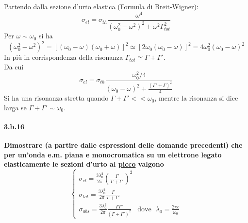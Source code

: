 \documentclass[twoside]{article}
\begin{document}
Partendo dalla sezione d'urto elastica (Formula di Breit-Wigner):
\begin{equation}
    \sigma_{el}=\sigma_{th}\frac{\omega^4}{(\omega_0^2-\omega^2)^2+\omega^2 \Gamma_{tot}^2}
\end{equation}
Per $\omega \sim \omega_0$ si ha
\begin{equation}
    (\omega_0^2-\omega^2)^2= [(\omega_0-\omega)(\omega_0+\omega)]^2\simeq[2\omega_0(\omega_0-\omega)]^2=4\omega_0^2(\omega_0-\omega)^2
\end{equation}
In più in corrispondenza della risonanza $\Gamma_{tot}\simeq \Gamma + \Gamma'$. \\
Da cui
\begin{equation}
    \sigma_{el}=\sigma_{th}\frac{\omega_0^2/4}{(\omega_0-\omega)^2+\frac{(\Gamma'+\Gamma)^2}{4}}
\end{equation}
Si ha una risonanza stretta quando $\Gamma +\Gamma' << \omega_0$, mentre la risonanza si dice larga se $\Gamma +\Gamma'\sim \omega_0$.




\paragraph{3.b.16}\textbf{Dimostrare (a partire dalle espressioni delle domande precedenti) che per un’onda
e.m. piana e monocromatica su un elettrone legato elasticamente le sezioni d’urto
al \underline{picco} valgono \begin{equation*}
  \left\{  \begin{array}{lr}
         \sigma_{el}=\frac{3\lambda_0^2}{2\pi}\left( \frac{\Gamma}{\Gamma+\Gamma'} \right)^2  \\
         \sigma_{tot}=\frac{3\lambda_0^2}{2\pi}\frac{\Gamma}{\Gamma+\Gamma'} \\
         \sigma_{abs}=\frac{3\lambda_0^2}{2\pi}\frac{\Gamma \Gamma'}{(\Gamma+\Gamma')^2} \ \ \ \ \text{dove} \ \ \ \lambda_0=\frac{2\pi c}{\omega_0}
    \end{array} \right.
\end{equation*}
}\\ \\
\end{document}
